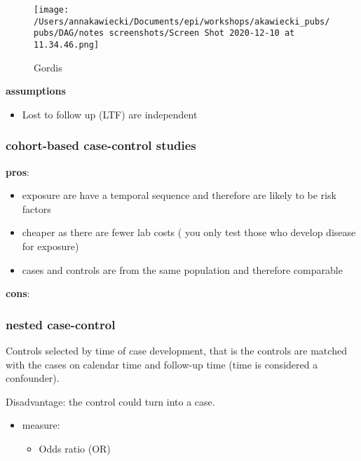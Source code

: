 \documentclass[
]{article}
\providecommand{\tightlist}{%
  \setlength{\itemsep}{0pt}\setlength{\parskip}{0pt}}
\begin{document}
\begin{figure}
\centering
\texttt{[image: /Users/annakawiecki/Documents/epi/workshops/akawiecki\_pubs/pubs/DAG/notes screenshots/Screen Shot 2020-12-10 at 11.34.46.png]}
\caption{Gordis}
\end{figure}

\textbf{assumptions}

\begin{itemize}
\tightlist
\item
  Lost to follow up (LTF) are independent
\end{itemize}

\hypertarget{cohort-based-case-control-studies}{%
\subsubsection{\texorpdfstring{\textbf{cohort-based case-control
studies}}{cohort-based case-control studies}}\label{cohort-based-case-control-studies}}

\textbf{pros}:

\begin{itemize}
\item
  exposure are have a temporal sequence and therefore are likely to be
  risk factors
\item
  cheaper as there are fewer lab costs ( you only test those who develop
  disease for exposure)
\item
  cases and controls are from the same population and therefore
  comparable
\end{itemize}

\textbf{cons}:

\hypertarget{nested-case-control}{%
\subsubsection{nested case-control}\label{nested-case-control}}

Controls selected by time of case development, that is the controls are
matched with the cases on calendar time and follow-up time (time is
considered a confounder).

Disadvantage: the control could turn into a case.

\begin{itemize}
\item
  measure:

  \begin{itemize}
  \tightlist
  \item
    Odds ratio (OR)
  \end{itemize}
\end{itemize}
\end{document}
